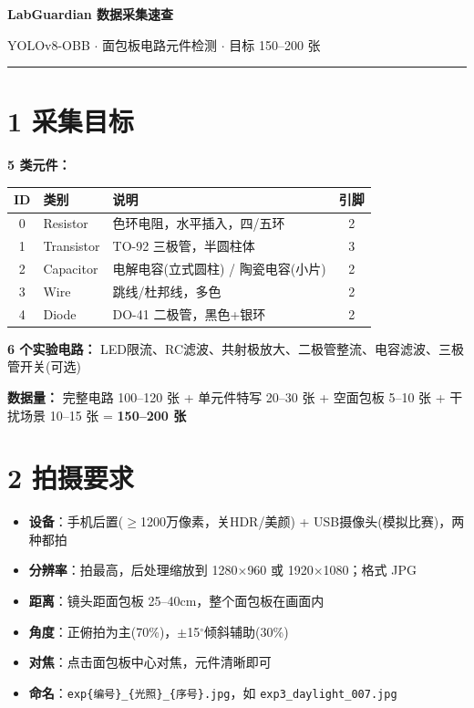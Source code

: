 \documentclass[a4paper, 10pt, fontset=windows]{ctexart}
\begin{document}
{\centering\Large\bfseries LabGuardian 数据采集速查\par}
\vspace{2pt}
{\centering\small\color{gray} YOLOv8-OBB $\cdot$ 面包板电路元件检测 $\cdot$ 目标 150--200 张\par}
\vspace{6pt}
\hrule
\vspace{6pt}

\section*{1 \quad 采集目标}

\textbf{5 类元件：}
\begin{tabular}{@{}cllc@{}}
\toprule
ID & 类别 & 说明 & 引脚 \\
\midrule
0 & Resistor   & 色环电阻，水平插入，四/五环              & 2 \\
1 & Transistor & TO-92 三极管，半圆柱体                   & 3 \\
2 & Capacitor  & 电解电容(立式圆柱) / 陶瓷电容(小片)      & 2 \\
3 & Wire       & 跳线/杜邦线，多色                        & 2 \\
4 & Diode      & DO-41 二极管，黑色+银环                   & 2 \\
\bottomrule
\end{tabular}

\medskip
\textbf{6 个实验电路：}
LED限流、RC滤波、共射极放大、二极管整流、电容滤波、三极管开关(可选)

\medskip
\textbf{数据量：}
完整电路 100--120 张 + 单元件特写 20--30 张 + 空面包板 5--10 张 + 干扰场景 10--15 张 = \textbf{150--200 张}

\section*{2 \quad 拍摄要求}

\begin{itemize}
  \item \textbf{设备}：手机后置($\geq$1200万像素，关HDR/美颜) + USB摄像头(模拟比赛)，两种都拍
  \item \textbf{分辨率}：拍最高，后处理缩放到 1280$\times$960 或 1920$\times$1080；格式 JPG
  \item \textbf{距离}：镜头距面包板 25--40cm，整个面包板在画面内
  \item \textbf{角度}：正俯拍为主(70\%)，$\pm$15$^\circ$倾斜辅助(30\%)
  \item \textbf{对焦}：点击面包板中心对焦，元件清晰即可
  \item \textbf{命名}：\texttt{exp\{编号\}\_\{光照\}\_\{序号\}.jpg}，如 \texttt{exp3\_daylight\_007.jpg}
\end{itemize}
\end{document}
